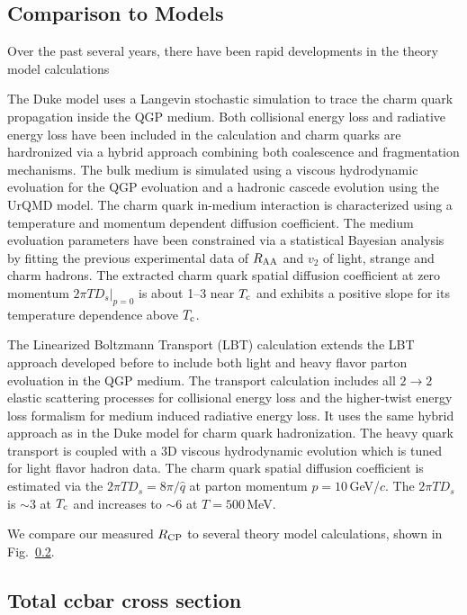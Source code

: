 \subsection{\label{result:theory}Comparison to Models}

Over the past several years, there have been rapid developments in the theory model calculations 

The Duke model uses a Langevin stochastic simulation to trace the charm quark propagation inside the QGP medium. Both collisional energy loss and radiative energy loss have been included in the calculation and charm quarks are hardronized via a hybrid approach combining both coalescence and fragmentation mechanisms. The bulk medium is simulated using a viscous hydrodynamic evoluation for the QGP evoluation and a hadronic cascede evolution using the UrQMD model. The charm quark in-medium interaction is characterized using a temperature and momentum dependent diffusion coefficient. The medium evoluation parameters have been constrained via a statistical Bayesian analysis by fitting the previous experimental data of $R_{\rm AA}$ and $v_{2}$ of light, strange and charm hadrons. The extracted charm quark spatial diffusion coefficient at zero momentum $2\pi TD_s|_{p=0}$ is about 1--3 near $T_{\rm c}$ and exhibits a positive slope for its temperature dependence above $T_{\rm c}$.

The Linearized Boltzmann Transport (LBT) calculation extends the LBT approach developed before to include both light and heavy flavor parton evoluation in the QGP medium. The transport calculation includes all $2\rightarrow 2$ elastic scattering processes for collisional energy loss and the higher-twist energy loss formalism for medium induced radiative energy loss. It uses the same hybrid approach as in the Duke model for charm quark hadronization. The heavy quark transport is coupled with a 3D viscous hydrodynamic evolution which is tuned for light flavor hadron data. The charm quark spatial diffusion coefficient is estimated via the $2\pi TD_s =8\pi/\hat{q}$ at parton momentum $p = 10$\,GeV/$c$. The $2\pi TD_s$ is $\sim$3 at $T_{\rm c}$ and increases to $\sim$6 at $T = 500$\,MeV.

We compare our measured $R_{\rm CP}$ to several theory model calculations, shown in Fig.~\ref{}. 

\subsection{\label{result:totalCC} Total ccbar cross section}


